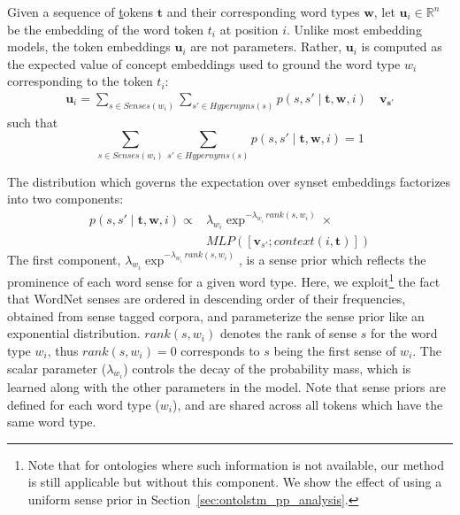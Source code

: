 Given a sequence of \underline{t}okens $\boldsymbol{t}$ and their corresponding word types $\boldsymbol{w}$, let $\mathbf{u}_i  \in \mathbb{R}^n$
be the embedding of the word token $t_i$ at position $i$. Unlike most embedding models, the token embeddings $\mathbf{u}_i$ are not parameters.
Rather, $\mathbf{u}_i$ is computed as the expected value of concept embeddings used to ground the word type $w_i$ corresponding to the token $t_i$:
\begin{align}
\mathbf{u}_i = \sum_{s \in \textit{Senses}(w_i)} 
\sum_{s' \in \textit{Hypernyms}(s)}
p(s, s' \mid \boldsymbol{t}, \boldsymbol{w}, i) \  &\mathbf{v_{s'}} 
 \label{eq:ontolstm_token_embedding}\end{align}
such that
\begin{equation}
\sum_{s \in \textit{Senses}(w_i)} \sum_{s' \in \textit{Hypernyms}(s)} p(s, s' \mid \boldsymbol{t}, \boldsymbol{w}, i) = 1
\nonumber \end{equation}

The distribution which governs the expectation over synset embeddings factorizes into two components:
\begin{align}
p(s, s' \mid \boldsymbol{t}, \boldsymbol{w}, i) \propto& 
\lambda_{w_i} \exp^{-\lambda_{w_i} \  \textit{rank}(s, w_i)} \times \nonumber \\
&  \textit{MLP}( [\mathbf{v}_{s'}; \textit{context}(i, \boldsymbol{t})]) 
\label{eq:ontolstm_attention}
\end{align}
The first component, $\lambda_{w_i} \exp^{-\lambda_{w_i} \  \textit{rank}(s, w_i)}$, is a sense prior which reflects the prominence of each word sense for a given word type. Here, we exploit\footnote{Note that for ontologies where such information is not available, our method is still applicable but without this component.
We show the effect of using a uniform sense prior in Section~\ref{sec:ontolstm_pp_analysis}.} the fact that WordNet senses are ordered in descending order of their frequencies, obtained from sense tagged corpora, and parameterize the sense prior like an exponential distribution.
$rank(s, w_i)$ denotes the rank of sense $s$ for the word type $w_i$, thus $rank(s, w_i)=0$ corresponds to $s$ being the first sense of $w_i$.
The scalar parameter ($\lambda_{w_i}$) controls the decay of the probability mass, which is learned along with the other parameters in the model. Note that sense priors are defined for each word type ($w_i$), and are shared across all tokens which have the same word type.

